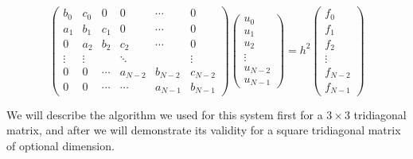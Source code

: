 \documentclass {article}
\begin{document}
\begin{equation}
 \begin{pmatrix}
   b_0 & c_0 &  0 & 0 & \cdots & 0  \\
  a_1 & b_1 & c_1 & 0 & \cdots & 0  \\
   0 & a_2 &  b_2 & c_2 & \cdots & 0 \\
  \vdots  & \vdots  & & \ddots & & \vdots   \\
   0 &  0 & \cdots  & a_{N-2} & b_{N-2} & c_{N-2} \\
   0 &  0 & \cdots & \cdots  & a_{N-1} & b_{N-1}
 \end{pmatrix}
 \begin{pmatrix}
  u_0 \\
  u_1 \\
  u_2 \\
  \vdots  \\
  u_{N-2} \\
  u_{N-1} 
 \end{pmatrix}
 =h^2
 \begin{pmatrix}
  f_0 \\
  f_1 \\
  f_2 \\
  \vdots  \\
  f_{N-2} \\
  f_{N-1} 
 \end{pmatrix}
\end{equation}

We will describe the algorithm we used for this system first for a $3\times3$ tridiagonal matrix, and after we will demonstrate its validity for a square tridiagonal matrix of optional dimension.
\end{document}
